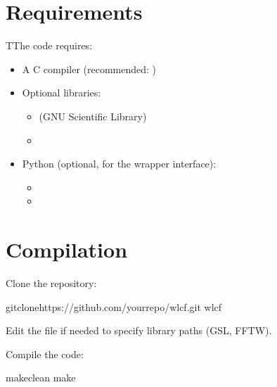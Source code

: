 \documentclass[letterpaper,10pt,english]{sphinxmanual}
\begin{document}
\section{Requirements}
\label{\detokenize{installation:requirements}}
\sphinxAtStartPar
TThe code requires:
\begin{itemize}
\item {} 
\sphinxAtStartPar
A C compiler (recommended: )

\item {} 
\sphinxAtStartPar
Optional libraries:
\begin{itemize}
\item {} 
\sphinxAtStartPar
{} (GNU Scientific Library)

\item {} 
\sphinxAtStartPar
{}

\end{itemize}

\item {} 
\sphinxAtStartPar
Python (optional, for the wrapper interface):
\begin{itemize}
\item {} 
\sphinxAtStartPar
{}

\item {} 
\sphinxAtStartPar
{}

\end{itemize}

\end{itemize}


\section{Compilation}
\label{\detokenize{installation:compilation}}
\sphinxAtStartPar
Clone the repository:

\begin{sphinxVerbatim}[commandchars=\\\{\}]
gitclonehttps://github.com/your\PYGZhy{}repo/wlcf.git
wlcf
\end{sphinxVerbatim}

\sphinxAtStartPar
Edit the file  if needed to specify library paths (GSL, FFTW).

\sphinxAtStartPar
Compile the code:

\begin{sphinxVerbatim}[commandchars=\\\{\}]
makeclean
make
\end{sphinxVerbatim}
\end{document}
